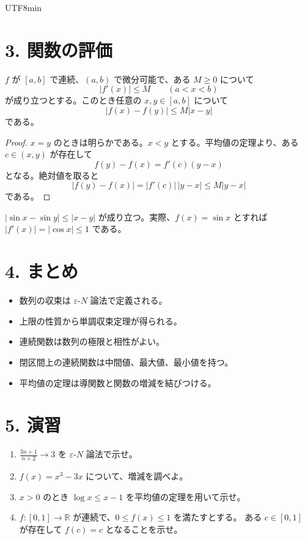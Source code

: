 \documentclass[a4paper,12pt]{article}
\begin{document}
\begin{CJK}{UTF8}{min}
\section*{3. 関数の評価}

\begin{theorem}
$f$ が $[a,b]$ で連続、$(a,b)$ で微分可能で、ある $M\ge0$ について
\[
|f'(x)|\le M\qquad (a<x<b)
\]
が成り立つとする。このとき任意の $x,y\in[a,b]$ について
\[
|f(x)-f(y)|\le M|x-y|
\]
である。
\end{theorem}

\begin{proof}
$x=y$ のときは明らかである。$x<y$ とする。平均値の定理より、ある
$c\in(x,y)$ が存在して
\[
f(y)-f(x)=f'(c)(y-x)
\]
となる。絶対値を取ると
\[
|f(y)-f(x)|=|f'(c)|\,|y-x|\le M|y-x|
\]
である。
\end{proof}

\begin{example}
$|\sin x-\sin y|\le |x-y|$ が成り立つ。実際、$f(x)=\sin x$ とすれば
$|f'(x)|=|\cos x|\le1$ である。
\end{example}

\section*{4. まとめ}

\begin{itemize}
\item 数列の収束は $\varepsilon$-$N$ 論法で定義される。
\item 上限の性質から単調収束定理が得られる。
\item 連続関数は数列の極限と相性がよい。
\item 閉区間上の連続関数は中間値、最大値、最小値を持つ。
\item 平均値の定理は導関数と関数の増減を結びつける。
\end{itemize}

\section*{5. 演習}

\begin{enumerate}
\item $\displaystyle \frac{3n+1}{n+2}\to3$ を $\varepsilon$-$N$ 論法で示せ。
\item $f(x)=x^3-3x$ について、増減を調べよ。
\item $x>0$ のとき $\log x\le x-1$ を平均値の定理を用いて示せ。
\item $f:[0,1]\to\mathbb{R}$ が連続で、$0\le f(x)\le1$ を満たすとする。
ある $c\in[0,1]$ が存在して $f(c)=c$ となることを示せ。
\end{enumerate}

\ifPDFTeX
\end{CJK}
\fi
\end{document}
